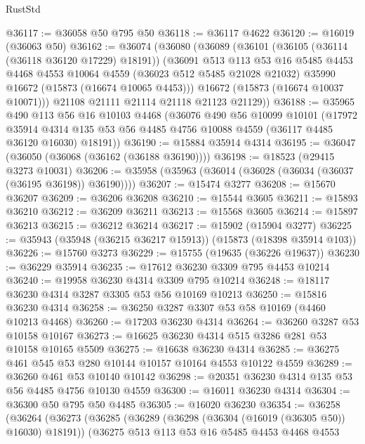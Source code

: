 \begin{lexlean}{RustStd}
\begin{coremodule}
@36117 := @36058 @50 @795 @50
@36118 := @36117 @4622
@36120 := @16019 (@36063 @50)
@36162 := @36074
    (@36080
      (@36089
        (@36101
          (@36105 (@36114 (@36118 @36120 @17229) @18191))
          (@36091
            @513
            @113
            @53
            @16
            @5485
            @4453
            @4468
            @4553
            @10064
            @4559
            (@36023 @512 @5485 @21028 @21032)
            @35990
            @16672
            (@15873 (@16674 @10065 @4453)))
          @16672
          (@15873 (@16674 @10037 @10071)))
        @21108
        @21111
        @21114
        @21118
        @21123
        @21129))
@36188 := @35965
    @490
    @113
    @56
    @16
    @10103
    @4468
    (@36076
      @490
      @56
      @10099
      @10101
      (@17972
        @35914
        @4314
        @135
        @53
        @56
        @4485
        @4756
        @10088
        @4559
        (@36117 @4485 @36120 @16030)
        @18191))
@36190 := @15884 @35914 @4314
@36195 := @36047 (@36050 (@36068 (@36162 (@36188 @36190))))
@36198 := @18523 (@29415 @3273 @10031)
@36206 := @35958 (@35963 (@36014 (@36028 (@36034 (@36037 (@36195 @36198)) @36190))))
@36207 := @15474 @3277
@36208 := @15670 @36207
@36209 := @36206 @36208
@36210 := @15544 @3605
@36211 := @15893 @36210
@36212 := @36209 @36211
@36213 := @15568 @3605
@36214 := @15897 @36213
@36215 := @36212 @36214
@36217 := @15902 (@15904 @3277)
@36225 := @35943 (@35948 (@36215 @36217 @15913)) (@15873 (@18398 @35914 @103))
@36226 := @15760 @3273
@36229 := @15755 (@19635 (@36226 @19637))
@36230 := @36229 @35914
@36235 := @17612 @36230 @3309 @795 @4453 @10214
@36240 := @19958 @36230 @4314 @3309 @795 @10214
@36248 := @18117 @36230 @4314 @3287 @3305 @53 @56 @10169 @10213
@36250 := @15816 @36230 @4314
@36258 := @36250 @3287 @3307 @53 @58 @10169 (@4460 @10213 @4468)
@36260 := @17203 @36230 @4314
@36264 := @36260 @3287 @53 @10158 @10167
@36273 := @16625 @36230 @4314 @515 @3286 @281 @53 @10158 @10165 @5509
@36275 := @16638 @36230 @4314
@36285 := @36275 @461 @545 @53 @280 @10144 @10157 @10164 @4553 @10122 @4559
@36289 := @36260 @461 @53 @10140 @10142
@36298 := @20351 @36230 @4314 @135 @53 @56 @4485 @4756 @10130 @4559
@36300 := @16011 @36230 @4314
@36304 := @36300 @50 @795 @50 @4485
@36305 := @16020 @36230
@36354 := @36258
    (@36264
      (@36273
        (@36285
          (@36289 (@36298 (@36304 (@16019 (@36305 @50)) @16030) @18191))
          (@36275
            @513
            @113
            @53
            @16
            @5485
            @4453
            @4468
            @4553

\end{coremodule}
\end{lexlean}

